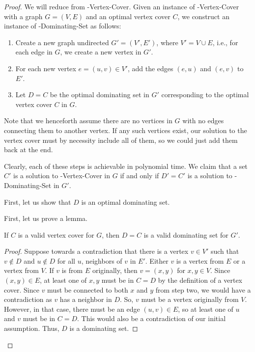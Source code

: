 \begin{proof}
We will reduce from \inob{}-Vertex-Cover. Given an instance of \inob{}-Vertex-Cover with a graph $G=(V,E)$ and an optimal vertex cover $C$, we construct an instance of \inob{}-Dominating-Set as follows:

    \begin{enumerate}
        \item Create a new graph undirected $G'=(V',E')$, where $V' = V \cup E$, i.e., for each edge in $G$, we create a new vertex in $G'$.
        \item For each new vertex $e=(u,v) \in V'$, add the edges $(e,u)$ and $(e,v)$ to $E'$.
        \item Let $D = C$ be the optimal dominating set in $G'$ corresponding to the optimal vertex cover $C$ in $G$.
    \end{enumerate}
    Note that we henceforth assume there are no vertices in $G$ with no edges connecting them to another vertex. If any such vertices exist, our solution to the vertex cover must by necessity include all of them, so we could just add them back at the end. 
    
    Clearly, each of these steps is achievable in polynomial time. We claim that a set $C'$ is a solution to \inob{}-Vertex-Cover in $G$ if and only if $D' = C'$ is a solution to \inob{}-Dominating-Set in $G'$.

    First, let us show that $D$ is an optimal dominating set. 
    
    First, let us prove a lemma.
    \begin{lemma}
        If $C$ is a valid vertex cover for $G$, then $D = C$ is a valid dominating set for $G'$.
    \end{lemma}
    
    \begin{proof}
        Suppose towards a contradiction that there is a vertex $v \in V'$ such that $v \not\in D$ and $u \not \in D$ for all $u$, neighbors of $v$ in $E'$. Either $v$ is a vertex from $E$ or a vertex from $V$. If $v$ is from $E$ originally, then $v = (x,y)$ for $x,y \in V$. Since $(x,y) \in E$, at least one of $x,y$ must be in $C=D$ by the definition of a vertex cover. Since $v$ must be connected to both $x$ and $y$ from step two, we would have a contradiction as $v$ has a neighbor in $D$. So, $v$ must be a vertex originally from $V$. However, in that case, there must be an edge $(u,v) \in E$, so at least one of $u$ and $v$ must be in $C=D$. This would also be a contradiction of our initial assumption. Thus, $D$ is a dominating set.
    \end{proof}


\end{proof}
